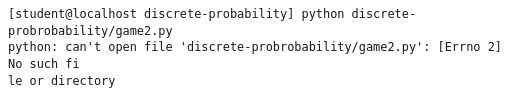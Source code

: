 \begin{Verbatim}[frame=single,fontsize=\small]
[student@localhost discrete-probability] python discrete-probrobability/game2.py
python: can't open file 'discrete-probrobability/game2.py': [Errno 2] No such fi
le or directory
\end{Verbatim}

